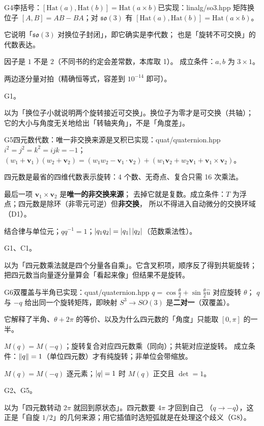 \begin{know}{G4}{李括号：$[\mathrm{Hat}(a),\mathrm{Hat}(b)]=\mathrm{Hat}(a\times b)$}{已实现：linalg/so3.hpp}
 矩阵换位子 $[A,B]=AB-BA$；对 $\mathfrak{so}(3)$ 有
$[\mathrm{Hat}(a),\mathrm{Hat}(b)]=\mathrm{Hat}(a\times b)$。

 它说明「$\mathfrak{so}(3)$ 对换位子封闭」，即它确实是李代数；
也是「旋转不可交换」的代数表达。

 因子是 $1$ 不是 $2$（不同书的约定会差常数，本库取 1）。
成立条件：$a,b$ 为 $3\times1$。

 两边逐分量对拍（精确恒等式，容差到 $10^{-14}$ 即可）。

 G1。

 以为「换位子小就说明两个旋转接近可交换」。换位子为零才是可交换（共轴）；
它的大小与角度无关地给出「转轴夹角」，不是「角度差」。
\end{know}

\begin{know}{G5}{四元数代数：唯一非交换来源是叉积}{已实现：quat/quaternion.hpp}
 $i^{2}=j^{2}=k^{2}=ijk=-1$；
$(w_1+\mathbf v_1)(w_2+\mathbf v_2)=(w_1w_2-\mathbf v_1\cdot\mathbf v_2)+
(w_1\mathbf v_2+w_2\mathbf v_1+\mathbf v_1\times\mathbf v_2)$。

 四元数是最省的四维代数表示旋转：4 个数、无奇点、复合只需 16 次乘法。

 最后一项 $\mathbf v_1\times\mathbf v_2$ 是\textbf{唯一的非交换来源}；
去掉它就是复数。成立条件：$T$ 为浮点；四元数是除环（非零元可逆）但\textbf{非交换}，
所以不得进入自动微分的交换环域（D1）。

 结合律与单位元；$qq^{-1}=1$；$\left\lvert q_1q_2\right\rvert=\left\lvert q_1\right\rvert\left\lvert q_2\right\rvert$（范数乘法性）。

 G1、C1。

 以为「四元数乘法就是四个分量各自乘」。它含叉积项，顺序反了得到共轭旋转；
把四元数当向量逐分量算会「看起来像」但结果不是旋转。
\end{know}

\begin{know}{G6}{双覆盖与半角}{已实现：quat/quaternion.hpp}
 $q=\cos\frac\theta2+\sin\frac\theta2\hat u$ 对应旋转 $\theta$；
$q$ 与 $-q$ 给出同一个旋转矩阵，即映射 $S^{3}\to SO(3)$ 是\textbf{二对一}（双覆盖）。

 它解释了半角、$\theta+2\pi$ 的等价、以及为什么四元数的「角度」只能取 $[0,\pi]$ 的一半。

 $M(q)=M(-q)$；旋转复合对应四元数乘（同向）；共轭对应逆旋转。
成立条件：$\left\lVert q\right\rVert=1$（单位四元数）才有纯旋转；非单位会带缩放。

 $M(q)=M(-q)$ 逐元素；$\left\lvert q\right\rvert=1$ 时 $M(q)$ 正交且 $\det=1$。

 G2、G5。

 以为「四元数转动 $2\pi$ 就回到原状态」。四元数要 $4\pi$ 才回到自己
（$q\to-q$），这正是「自旋 $1/2$」的几何来源；用它插值时选短弧就是在处理这个歧义（G8）。
\end{know}

